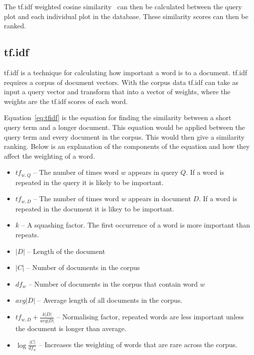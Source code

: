The tf.idf weighted cosine similarity~\cite[p.~243]{se_book} can then be calculated between the query plot and each individual plot in the database.  These similarity scores can then be ranked.

\subsection{tf.idf}
\label{sec:tfidf}

\ac{tf.idf} is a technique for calculating how important a word is to a document.  \ac{tf.idf} requires a corpus of document vectors.  With the corpus data \ac{tf.idf} can take as input a query vector and transform that into a vector of weights, where the weights are the \ac{tf.idf} scores of each word.


Equation~\ref{eq:tfidf} is the equation for finding the similarity between a short query term and a longer document.  This equation would be applied between the query term and every document in the corpus.  This would then give a similarity ranking.  Below is an explanation of the components of the equation and how they affect the weighting of a word.

\begin{itemize}
    \item $tf_{w,Q}$ -- The number of times word $w$ appears in query $Q$.  If a word is repeated in the query it is likely to be important.
    \item $tf_{w,D}$ -- The number of times word $w$ appears in document $D$.  If a word is repeated in the document it is likey to be important.
    \item $k$ -- A squashing factor.  The first occurrence of a word is more important than repeats.
    \item $|D|$ -- Length of the document
    \item $|C|$ -- Number of documents in the corpus
    \item $df_{w}$ -- Number of documents in the corpus that contain word $w$
    \item $avg|D|$ -- Average length of all documents in the corpus.
    \item $tf_{w,D} + \frac{k|D|}{avg|D|}$ -- Normalising factor, repeated words are less important unless the document is longer than average.
    \item $\log \frac{|C|}{df_{w}}$ -- Increases the weighting of words that are rare across the corpus.
\end{itemize}

